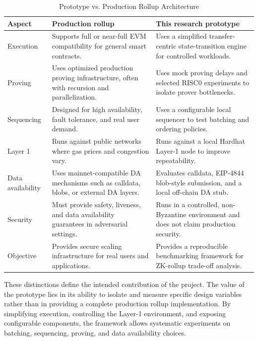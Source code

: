 \begin{table}[!htbp]
\centering
\caption{Prototype vs. Production Rollup Architecture}
\label{tab:prototype_vs_production}
\scriptsize
\setlength{\tabcolsep}{3pt}
\renewcommand{\arraystretch}{1.18}
\begin{tabularx}{\textwidth}{@{}p{}Y Y@{}}
\toprule
\textbf{Aspect} & \textbf{Production rollup} & \textbf{This research prototype} \\
\midrule

Execution 
& Supports full or near-full EVM compatibility for general smart contracts. 
& Uses a simplified transfer-centric state-transition engine for controlled workloads. \\

\addlinespace

Proving 
& Uses optimized production proving infrastructure, often with recursion and parallelization. 
& Uses mock proving delays and selected RISC0 experiments to isolate prover bottlenecks. \\

\addlinespace

Sequencing 
& Designed for high availability, fault tolerance, and real user demand. 
& Uses a configurable local sequencer to test batching and ordering policies. \\

\addlinespace

Layer 1 
& Runs against public networks where gas prices and congestion vary. 
& Runs against a local Hardhat Layer-1 node to improve repeatability. \\

\addlinespace

Data availability 
& Uses mainnet-compatible DA mechanisms such as calldata, blobs, or external DA layers. 
& Evaluates calldata, EIP-4844 blob-style submission, and a local off-chain DA stub. \\

\addlinespace

Security 
& Must provide safety, liveness, and data availability guarantees in adversarial settings. 
& Runs in a controlled, non-Byzantine environment and does not claim production security. \\

\addlinespace

Objective 
& Provides secure scaling infrastructure for real users and applications. 
& Provides a reproducible benchmarking framework for ZK-rollup trade-off analysis. \\

\bottomrule
\end{tabularx}
\normalsize
\end{table}

These distinctions define the intended contribution of the project. The value of the prototype lies in its ability to isolate and measure specific design variables rather than in providing a complete production rollup implementation. By simplifying execution, controlling the Layer-1 environment, and exposing configurable components, the framework allows systematic experiments on batching, sequencing, proving, and data availability choices.

